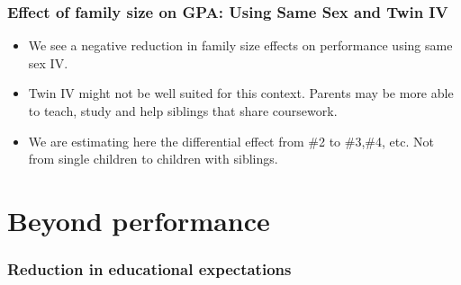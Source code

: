 \documentclass{beamer}
\begin{document}
\begin{frame}
    \label{frame:iv_conclusion}
    \frametitle{Effect of family size on GPA: Using Same Sex and Twin IV}
 \begin{itemize}
        \item We see a negative reduction in family size effects on performance using same sex IV.
        \item Twin IV might not be well suited for this context. Parents may be more able to teach, study and help siblings that share coursework.
        \item We are estimating here the differential effect from \#2 to \#3,\#4, etc. Not from single children to children with siblings.
    \end{itemize}
\end{frame}

\section{Beyond performance}

    \begin{frame}
            \label{frame:expectations}
            \frametitle{Reduction in educational expectations}
      {
    }   %
    \end{frame}
\end{document}
